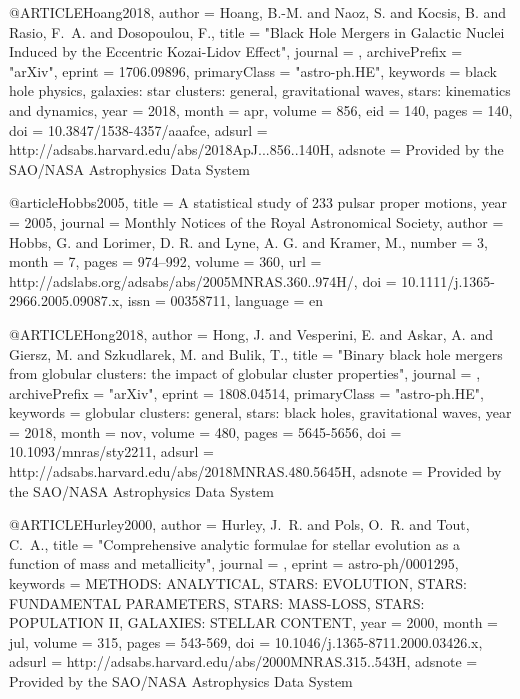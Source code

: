 \documentclass[twocolumn,tighten]{aastex63}
\begin{document}
{{{{{@ARTICLE{Hoang2018,
   author = {{Hoang}, B.-M. and {Naoz}, S. and {Kocsis}, B. and {Rasio}, F.~A. and 
	{Dosopoulou}, F.},
    title = "{Black Hole Mergers in Galactic Nuclei Induced by the Eccentric Kozai-Lidov Effect}",
  journal = {\apj},
archivePrefix = "arXiv",
   eprint = {1706.09896},
 primaryClass = "astro-ph.HE",
 keywords = {black hole physics, galaxies: star clusters: general, gravitational waves, stars: kinematics and dynamics},
     year = 2018,
    month = apr,
   volume = 856,
      eid = {140},
    pages = {140},
      doi = {10.3847/1538-4357/aaafce},
   adsurl = {http://adsabs.harvard.edu/abs/2018ApJ...856..140H},
  adsnote = {Provided by the SAO/NASA Astrophysics Data System}
}

@article{Hobbs2005,
    title = {{A statistical study of 233 pulsar proper motions}},
    year = {2005},
    journal = {Monthly Notices of the Royal Astronomical Society},
    author = {Hobbs, G. and Lorimer, D. R. and Lyne, A. G. and Kramer, M.},
    number = {3},
    month = {7},
    pages = {974--992},
    volume = {360},
    url = {http://adslabs.org/adsabs/abs/2005MNRAS.360..974H/},
    doi = {10.1111/j.1365-2966.2005.09087.x},
    issn = {00358711},
    language = {en}
}

@ARTICLE{Hong2018,
   author = {{Hong}, J. and {Vesperini}, E. and {Askar}, A. and {Giersz}, M. and 
	{Szkudlarek}, M. and {Bulik}, T.},
    title = "{Binary black hole mergers from globular clusters: the impact of globular cluster properties}",
  journal = {\mnras},
archivePrefix = "arXiv",
   eprint = {1808.04514},
 primaryClass = "astro-ph.HE",
 keywords = {globular clusters: general, stars: black holes, gravitational waves},
     year = 2018,
    month = nov,
   volume = 480,
    pages = {5645-5656},
      doi = {10.1093/mnras/sty2211},
   adsurl = {http://adsabs.harvard.edu/abs/2018MNRAS.480.5645H},
  adsnote = {Provided by the SAO/NASA Astrophysics Data System}
}

@ARTICLE{Hurley2000,
   author = {{Hurley}, J.~R. and {Pols}, O.~R. and {Tout}, C.~A.},
    title = "{Comprehensive analytic formulae for stellar evolution as a function of mass and metallicity}",
  journal = {\mnras},
   eprint = {astro-ph/0001295},
 keywords = {METHODS: ANALYTICAL, STARS: EVOLUTION, STARS: FUNDAMENTAL PARAMETERS, STARS: MASS-LOSS, STARS: POPULATION II, GALAXIES: STELLAR CONTENT},
     year = 2000,
    month = jul,
   volume = 315,
    pages = {543-569},
      doi = {10.1046/j.1365-8711.2000.03426.x},
   adsurl = {http://adsabs.harvard.edu/abs/2000MNRAS.315..543H},
  adsnote = {Provided by the SAO/NASA Astrophysics Data System}
}

}}}}}
\end{document}
